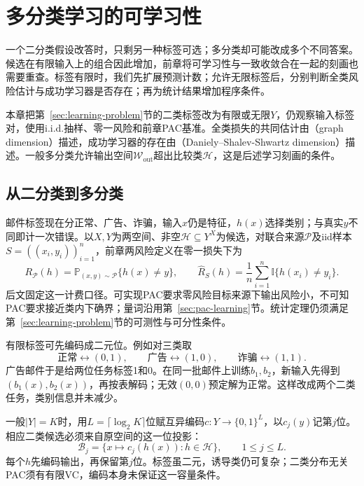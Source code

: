 \chapter{多分类学习的可学习性}
\label{chap:multiclass-learnability}

一个二分类假设改答时，只剩另一种标签可选；多分类却可能改成多个不同答案。候选在有限输入上的组合因此增加，前章将可学习性与一致收敛合在一起的刻画也需要重查。标签有限时，我们先扩展预测计数；允许无限标签后，分别判断全类风险估计与成功学习器是否存在；再为统计结果增加程序条件。

本章把第~\ref{sec:learning-problem}节的二类标签改为有限或无限$Y$，仍观察输入标签对，使用i.i.d.抽样、零一风险和前章PAC基准。全类损失的共同估计由（graph dimension）描述，成功学习器的存在由（Daniely--Shalev-Shwartz dimension）描述。一般多分类允许输出空间$\mathcal W_{\mathrm{out}}$超出比较类$\mathcal H$，这是后述学习刻画的条件。

\section{从二分类到多分类}
\label{sec:multiclass-setting}

邮件标签现在分正常、广告、诈骗，输入$x$仍是特征，$h(x)$选择类别；与真实$y$不同即计一次错误。以$X,Y$为两空间、非空$\mathcal H\subseteq Y^X$为候选，对联合来源$\mathcal P$及iid样本$S=((x_i,y_i))_{i=1}^n$，前章两风险定义在零一损失下为
\begin{equation}
 R_{\mathcal P}(h)=\mathbb P_{(x,y)\sim\mathcal P}\{h(x)\neq y\},\qquad
 \hat R_S(h)=\frac1n\sum_{i=1}^n\mathbb I\{h(x_i)\neq y_i\}.
 \label{eq:multiclass-risk}
\end{equation}
后文固定这一计费口径。可实现PAC要求零风险目标来源下输出风险小，不可知PAC要求接近类内下确界；量词沿用第~\ref{sec:pac-learning}节。统计定理仍须满足第~\ref{sec:learning-problem}节的可测性与可分性条件。

有限标签可先编码成二元位。例如对三类取
\[
 \text{正常}\longleftrightarrow(0,1),\qquad
 \text{广告}\longleftrightarrow(1,0),\qquad
 \text{诈骗}\longleftrightarrow(1,1).
\]
广告邮件于是给两位任务标签1和0。在同一批邮件上训练$b_1,b_2$，新输入先得到$(b_1(x),b_2(x))$，再按表解码；无效$(0,0)$预定解为正常。这样改成两个二类任务，类别信息并未减少。

一般$|Y|=K$时，用$L=\lceil\log_2K\rceil$位赋互异编码$c:Y\to\{0,1\}^L$，以$c_j(y)$记第$j$位。相应二类候选必须来自原空间的这一位投影：
\[
 \mathcal B_j=\{x\mapsto c_j(h(x)):h\in\mathcal H\},\qquad 1\leq j\leq L.
\]
每个$h$先编码输出，再保留第$j$位。标签虽二元，诱导类仍可复杂；二类分布无关PAC须有有限VC，编码本身未保证这一容量条件。

